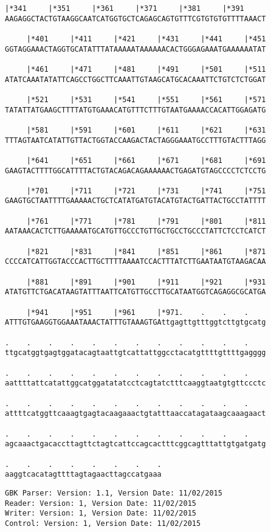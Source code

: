 \documentclass{article}
\begin{document}
\begin{Verbatim}[fontfamily=courier]
     |*341     |*351     |*361     |*371     |*381     |*391
AAGAGGCTACTGTAAGGCAATCATGGTGCTCAGAGCAGTGTTTCGTGTGTGTTTTAAACT

     |*401     |*411     |*421     |*431     |*441     |*451
GGTAGGAAACTAGGTGCATATTTATAAAAATAAAAAACACTGGGAGAAATGAAAAAATAT

     |*461     |*471     |*481     |*491     |*501     |*511
ATATCAAATATATTCAGCCTGGCTTCAAATTGTAAGCATGCACAAATTCTGTCTCTGGAT

     |*521     |*531     |*541     |*551     |*561     |*571
TATATTATGAAGCTTTTATGTGAAACATGTTTCTTTGTAATGAAAACCACATTGGAGATG

     |*581     |*591     |*601     |*611     |*621     |*631
TTTAGTAATCATATTGTTACTGGTACCAAGACTACTAGGGAAATGCCTTTGTACTTTAGG

     |*641     |*651     |*661     |*671     |*681     |*691
GAAGTACTTTTGGCATTTTACTGTACAGACAGAAAAAACTGAGATGTAGCCCCTCTCCTG

     |*701     |*711     |*721     |*731     |*741     |*751
GAAGTGCTAATTTTGAAAAACTGCTCATATGATGTACATGTACTGATTACTGCCTATTTT

     |*761     |*771     |*781     |*791     |*801     |*811
AATAAACACTCTTGAAAAATGCATGTTGCCCTGTTGCTGCCTGCCCTATTCTCCTCATCT

     |*821     |*831     |*841     |*851     |*861     |*871
CCCCATCATTGGTACCCACTTGCTTTTAAAATCCACTTTATCTTGAATAATGTAAGACAA

     |*881     |*891     |*901     |*911     |*921     |*931
ATATGTTCTGACATAAGTATTTAATTCATGTTGCCTTGCATAATGGTCAGAGGCGCATGA

     |*941     |*951     |*961     |*971.    .    .    .    
ATTTGTGAAGGTGGAAATAAACTATTTGTAAAGTGAttgagttgtttggtcttgtgcatg

.    .    .    .    .    .    .    .    .    .    .    .    
ttgcatggtgagtggatacagtaattgtcattattggcctacatgttttgttttgagggg

.    .    .    .    .    .    .    .    .    .    .    .    
aattttattcatattggcatggatatatcctcagtatctttcaaggtaatgtgttccctc

.    .    .    .    .    .    .    .    .    .    .    .    
attttcatggttcaaagtgagtacaagaaactgtatttaaccatagataagcaaagaact

.    .    .    .    .    .    .    .    .    .    .    .    
agcaaactgacaccttagttctagtcattccagcactttcggcagtttattgtgatgatg

.    .    .    .    .    .    .    .
aaggtcacatagttttagtagaacttagccatgaaa
\end{Verbatim}
\newpage
\begin{Verbatim}[fontfamily=courier]
GBK Parser: Version: 1.1, Version Date: 11/02/2015
Reader: Version: 1, Version Date: 11/02/2015
Writer: Version: 1, Version Date: 11/02/2015
Control: Version: 1, Version Date: 11/02/2015
\end{Verbatim}
\end{document}
